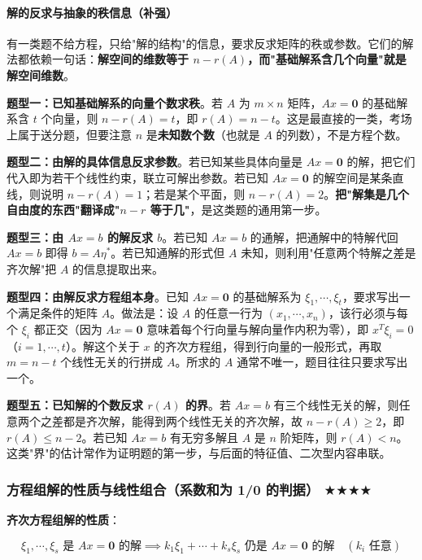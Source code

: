 \documentclass[11pt,openany,UTF8]{ctexbook}
\begin{document}
\paragraph{解的反求与抽象的秩信息（补强）}\mbox{}{\par}

有一类题不给方程，只给"解的结构"的信息，要求反求矩阵的秩或参数。它们的解法都依赖一句话：\textbf{解空间的维数等于 $n-r(A)$，而"基础解系含几个向量"就是解空间维数}。

\textbf{题型一：已知基础解系的向量个数求秩}。若 $A$ 为 $m\times n$ 矩阵，$Ax=\mathbf{0}$ 的基础解系含 $t$ 个向量，则 $n-r(A)=t$，即 $r(A)=n-t$。这是最直接的一类，考场上属于送分题，但要注意 $n$ 是\textbf{未知数个数}（也就是 $A$ 的列数），不是方程个数。

\textbf{题型二：由解的具体信息反求参数}。若已知某些具体向量是 $Ax=\mathbf{0}$ 的解，把它们代入即为若干个线性约束，联立可解出参数。若已知 $Ax=\mathbf{0}$ 的解空间是某条直线，则说明 $n-r(A)=1$；若是某个平面，则 $n-r(A)=2$。\textbf{把"解集是几个自由度的东西"翻译成"$n-r$ 等于几"}，是这类题的通用第一步。

\textbf{题型三：由 $Ax=b$ 的解反求 $b$}。若已知 $Ax=b$ 的通解，把通解中的特解代回 $Ax=b$ 即得 $b=A\eta^*$。若已知通解的形式但 $A$ 未知，则利用"任意两个特解之差是齐次解"把 $A$ 的信息提取出来。

\textbf{题型四：由解反求方程组本身}。已知 $Ax=\mathbf{0}$ 的基础解系为 $\xi_1,\cdots,\xi_t$，要求写出一个满足条件的矩阵 $A$。做法是：设 $A$ 的任意一行为 $(x_1,\cdots,x_n)$，该行必须与每个 $\xi_i$ 都正交（因为 $Ax=\mathbf{0}$ 意味着每个行向量与解向量作内积为零），即 $x^T\xi_i=0$（$i=1,\cdots,t$）。解这个关于 $x$ 的齐次方程组，得到行向量的一般形式，再取 $m=n-t$ 个线性无关的行拼成 $A$。所求的 $A$ 通常不唯一，题目往往只要求写出一个。

\textbf{题型五：已知解的个数反求 $r(A)$ 的界}。若 $Ax=b$ 有三个线性无关的解，则任意两个之差都是齐次解，能得到两个线性无关的齐次解，故 $n-r(A)\ge2$，即 $r(A)\le n-2$。若已知 $Ax=b$ 有无穷多解且 $A$ 是 $n$ 阶矩阵，则 $r(A)<n$。这类"界"的估计常作为证明题的第一步，与后面的特征值、二次型内容串联。

\subsubsection{方程组解的性质与线性组合（系数和为 1/0 的判据） $\bigstar$$\bigstar$$\bigstar$$\bigstar$}

\textbf{齐次方程组解的性质}：

\[\xi_1,\cdots,\xi_s\text{ 是 }Ax=\mathbf{0}\text{ 的解}\implies k_1\xi_1+\cdots+k_s\xi_s\text{ 仍是 }Ax=\mathbf{0}\text{ 的解}\quad(k_i\text{ 任意})\]
\end{document}
